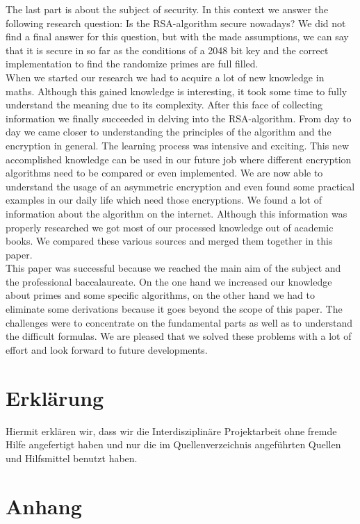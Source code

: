 The last part is about the subject of security. In this context we answer the following research question: Is the RSA-algorithm secure nowadays? We did not find a final answer for this question, but with the made assumptions, %
we can say that it is secure in so far as the conditions of a 2048 bit key and the correct implementation to find the randomize primes are full filled. \\
When we started our research we had to acquire a lot of new knowledge in maths. Although this gained knowledge is interesting, it took some time to fully understand the meaning due to its complexity. After this face of collecting information we finally succeeded in delving into the RSA-algorithm. %
From day to day we came closer to understanding the principles of the algorithm and the encryption in general. The learning process was intensive and exciting. This new accomplished knowledge can be used in our future job where different encryption algorithms need to be compared or even implemented. We are now able to understand the usage of an asymmetric encryption and even found some practical examples in our daily life which need those encryptions.  
We found a lot of information about the algorithm on the internet. Although this information was properly researched we got most of our processed knowledge out of academic books. We compared these various sources and merged them together in this paper.\\
This paper was successful because we reached the main aim of the subject and the professional baccalaureate. On the one hand we increased our knowledge about primes and some specific algorithms, on the other hand we had to eliminate some derivations  %
because it goes beyond the scope of this paper. The challenges were to concentrate on the fundamental parts as well as to understand the difficult formulas. We are pleased that we solved these problems with a lot of effort and look forward to future developments. 
\newpage
\section{Erklärung}
Hiermit erklären wir, dass wir die Interdisziplinäre Projektarbeit ohne fremde Hilfe angefertigt haben und nur die im Quellenverzeichnis angeführten Quellen und Hilfsmittel benutzt haben.
\newpage
\section{Anhang}
\listoffigures
\listoftables
%

